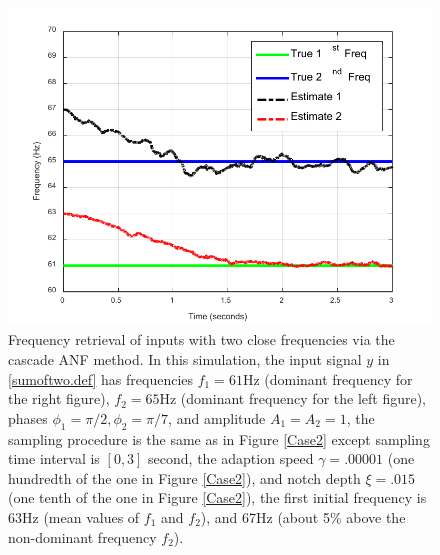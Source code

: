 \documentclass{UCF_ETD}
\begin{document}
\begin{figure}[H]
\begin{center}
\includegraphics[scale=0.9]{NonuniformANF/PathologicalCase}
\caption{Frequency  retrieval of inputs with two  close frequencies via the cascade ANF method.  In this simulation, the
input signal $y$ in \eqref{sumoftwo.def}
has frequencies $f_1=61$Hz (dominant frequency for the right figure), $f_2=65$Hz (dominant frequency for the left figure), phases
$\phi_1=\pi/2, \phi_2=\pi/7$, and amplitude $A_1= A_2=1$, the sampling procedure is the same as in Figure
\ref{Case2}
 except sampling time interval is $[0, 3]$ second,
the adaption speed $\gamma =  .00001$ (one hundredth of the one in Figure \ref{Case2}),
and
 notch depth $\xi = .015$ (one tenth of the one in Figure \ref{Case2}),
 the first initial frequency is $63$Hz (mean values of $f_1$ and $f_2$), %
 and 67Hz (about 5\% above the non-dominant frequency $f_2$).
}\label{closeCase1}
\end{center}
\end{figure}
\end{document}
